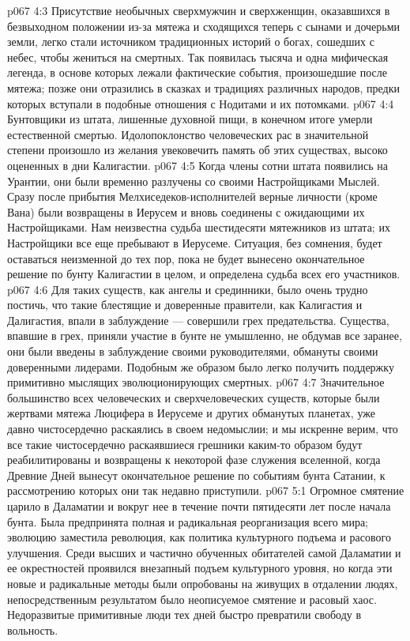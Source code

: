 \vs p067 4:3 Присутствие необычных сверхмужчин и сверхженщин, оказавшихся в безвыходном положении из\hyp{}за мятежа и сходящихся теперь с сынами и дочерьми земли, легко стали источником традиционных историй о богах, сошедших с небес, чтобы жениться на смертных. Так появилась тысяча и одна мифическая легенда, в основе которых лежали фактические события, произошедшие после мятежа; позже они отразились в сказках и традициях различных народов, предки которых вступали в подобные отношения с Нодитами и их потомками.
\vs p067 4:4 Бунтовщики из штата, лишенные духовной пищи, в конечном итоге умерли естественной смертью. Идолопоклонство человеческих рас в значительной степени произошло из желания увековечить память об этих существах, высоко оцененных в дни Калигастии.
\vs p067 4:5 Когда члены сотни штата появились на Урантии, они были временно разлучены со своими Настройщиками Мыслей. Сразу после прибытия Мелхиседеков\hyp{}исполнителей верные личности (кроме Вана) были возвращены в Иерусем и вновь соединены с ожидающими их Настройщиками. Нам неизвестна судьба шестидесяти мятежников из штата; их Настройщики все еще пребывают в Иерусеме. Ситуация, без сомнения, будет оставаться неизменной до тех пор, пока не будет вынесено окончательное решение по бунту Калигастии в целом, и определена судьба всех его участников.
\vs p067 4:6 \pc Для таких существ, как ангелы и срединники, было очень трудно постичь, что такие блестящие и доверенные правители, как Калигастия и Далигастия, впали в заблуждение --- совершили грех предательства. Существа, впавшие в грех, приняли участие в бунте не умышленно, не обдумав все заранее, они были введены в заблуждение своими руководителями, обмануты своими доверенными лидерами. Подобным же образом было легко получить поддержку примитивно мыслящих эволюционирующих смертных.
\vs p067 4:7 Значительное большинство всех человеческих и сверхчеловеческих существ, которые были жертвами мятежа Люцифера в Иерусеме и других обманутых планетах, уже давно чистосердечно раскаялись в своем недомыслии; и мы искренне верим, что все такие чистосердечно раскаявшиеся грешники каким\hyp{}то образом будут реабилитированы и возвращены к некоторой фазе служения вселенной, когда Древние Дней вынесут окончательное решение по событиям бунта Сатании, к рассмотрению которых они так недавно приступили.
\vs p067 5:1 Огромное смятение царило в Даламатии и вокруг нее в течение почти пятидесяти лет после начала бунта. Была предпринята полная и радикальная реорганизация всего мира; эволюцию заместила революция, как политика культурного подъема и расового улучшения. Среди высших и частично обученных обитателей самой Даламатии и ее окрестностей проявился внезапный подъем культурного уровня, но когда эти новые и радикальные методы были опробованы на живущих в отдалении людях, непосредственным результатом было неописуемое смятение и расовый хаос. Недоразвитые примитивные люди тех дней быстро превратили свободу в вольность.
